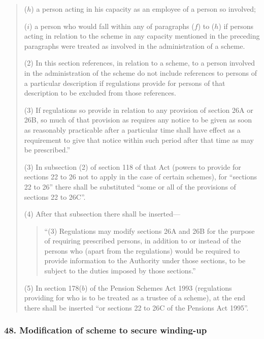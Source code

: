 \documentclass[12pt,a4paper]{article}
\begin{document}
\begin{quotation}
\begin{enumerate}
($h$) a person acting in his capacity as an employee of a person so involved;

($i$) a person who would fall within any of paragraphs ($f$)  to ($h$)  if persons acting in relation to the scheme in any capacity mentioned in the preceding paragraphs were treated as involved in the administration of a scheme.
\end{enumerate}

(2) In this section references, in relation to a scheme, to a person involved in the administration of the scheme do not include references to persons of a particular description if regulations provide for persons of that description to be excluded from those references.

(3) If regulations so provide in relation to any provision of section 26A or 26B, so much of that provision as requires any notice to be given as soon as reasonably practicable after a particular time shall have effect as a requirement to give that notice within such period after that time as may be prescribed.”

(3) In subsection (2)  of section 118 of that Act (powers to provide for sections 22 to 26 not to apply in the case of certain schemes), for “sections 22 to 26” there shall be substituted “some or all of the provisions of sections 22 to 26C”.

(4) After that subsection there shall be inserted—
\begin{quotation}
“(3) Regulations may modify sections 26A and 26B for the purpose of requiring prescribed persons, in addition to or instead of the persons who (apart from the regulations) would be required to provide information to the Authority under those sections, to be subject to the duties imposed by those sections.”
\end{quotation}

(5) In section 178($b$)  of the Pension Schemes Act 1993 (regulations providing for who is to be treated as a trustee of a scheme), at the end there shall be inserted “or sections 22 to 26C of the Pensions Act 1995”.
\end{quotation}

\subsubsection{48. Modification of scheme to secure winding-up}
\end{document}
